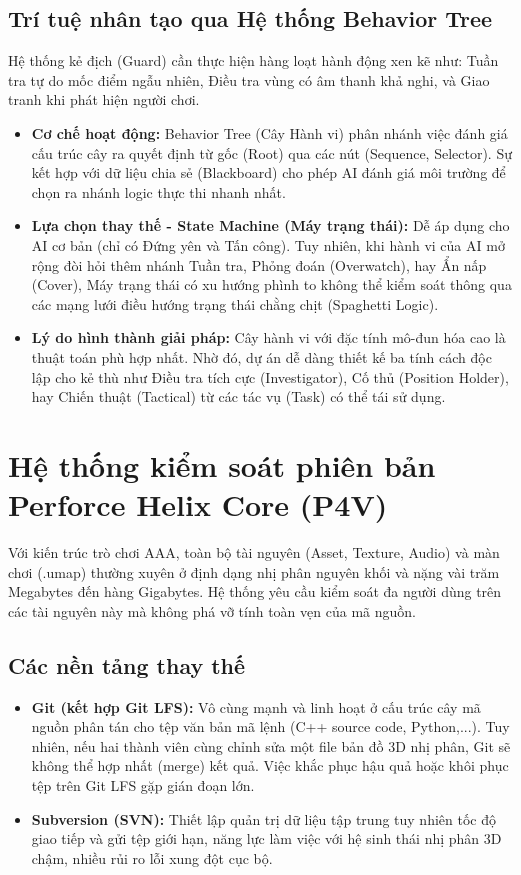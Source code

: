 \documentclass[../DoAn.tex]{subfiles}
\begin{document}
\subsection{Trí tuệ nhân tạo qua Hệ thống Behavior Tree}
Hệ thống kẻ địch (Guard) cần thực hiện hàng loạt hành động xen kẽ như: Tuần tra tự do mốc điểm ngẫu nhiên, Điều tra vùng có âm thanh khả nghi, và Giao tranh khi phát hiện người chơi.
\begin{itemize}
    \item \textbf{Cơ chế hoạt động:} Behavior Tree (Cây Hành vi) phân nhánh việc đánh giá cấu trúc cây ra quyết định từ gốc (Root) qua các nút (Sequence, Selector). Sự kết hợp với dữ liệu chia sẻ (Blackboard) cho phép AI đánh giá môi trường để chọn ra nhánh logic thực thi nhanh nhất.
    \item \textbf{Lựa chọn thay thế - State Machine (Máy trạng thái):} Dễ áp dụng cho AI cơ bản (chỉ có Đứng yên và Tấn công). Tuy nhiên, khi hành vi của AI mở rộng đòi hỏi thêm nhánh Tuần tra, Phỏng đoán (Overwatch), hay Ẩn nấp (Cover), Máy trạng thái có xu hướng phình to không thể kiểm soát thông qua các mạng lưới điều hướng trạng thái chằng chịt (Spaghetti Logic).
    \item \textbf{Lý do hình thành giải pháp:} Cây hành vi với đặc tính mô-đun hóa cao là thuật toán phù hợp nhất. Nhờ đó, dự án dễ dàng thiết kế ba tính cách độc lập cho kẻ thù như Điều tra tích cực (Investigator), Cố thủ (Position Holder), hay Chiến thuật (Tactical) từ các tác vụ (Task) có thể tái sử dụng.
\end{itemize}

\section{Hệ thống kiểm soát phiên bản Perforce Helix Core (P4V)}
\label{section:3.2}

Với kiến trúc trò chơi AAA, toàn bộ tài nguyên (Asset, Texture, Audio) và màn chơi (.umap) thường xuyên ở định dạng nhị phân nguyên khối và nặng vài trăm Megabytes đến hàng Gigabytes. Hệ thống yêu cầu kiểm soát đa người dùng trên các tài nguyên này mà không phá vỡ tính toàn vẹn của mã nguồn.

\subsection{Các nền tảng thay thế}
\begin{itemize}
    \item \textbf{Git (kết hợp Git LFS):} Vô cùng mạnh và linh hoạt ở cấu trúc cây mã nguồn phân tán cho tệp văn bản mã lệnh (C++ source code, Python,...). Tuy nhiên, nếu hai thành viên cùng chỉnh sửa một file bản đồ 3D nhị phân, Git sẽ không thể hợp nhất (merge) kết quả. Việc khắc phục hậu quả hoặc khôi phục tệp trên Git LFS gặp gián đoạn lớn.
    \item \textbf{Subversion (SVN):} Thiết lập quản trị dữ liệu tập trung tuy nhiên tốc độ giao tiếp và gửi tệp giới hạn, năng lực làm việc với hệ sinh thái nhị phân 3D chậm, nhiều rủi ro lỗi xung đột cục bộ.
\end{itemize}
\end{document}
